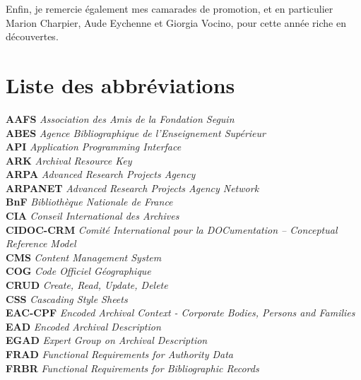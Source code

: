 \documentclass[a4paper,12pt,twoside]{book}
\begin{document}
 Enfin, je remercie également mes camarades de promotion, et en particulier Marion Charpier, Aude Eychenne et Giorgia Vocino, pour cette année riche en découvertes. 

	
	\printbibliography
	\chapter{Liste des abbréviations}
 \noindent
\textbf{AAFS}     \space\space\space\textit{Association des Amis de la Fondation Seguin}\\
\textbf{ABES}     \space\space\space\textit{Agence Bibliographique de l'Enseignement Supérieur}\\
\textbf{API}     \space\space\space\textit{Application Programming Interface}\\
\textbf{ARK}     \space\space\space\textit{Archival Resource Key}\\
\textbf{ARPA}     \space\space\space\textit{Advanced Research Projects Agency}\\
\textbf{ARPANET}     \space\space\space\textit{Advanced Research Projects Agency Network}\\
\textbf{BnF}     \space\space\space\textit{Bibliothèque Nationale de France}\\
\textbf{CIA}     \space\space\space\textit{Conseil International des Archives}\\
\textbf{CIDOC-CRM}     \space\space\space\textit{Comité International pour la DOCumentation – Conceptual Reference Model}\\
\textbf{CMS}     \space\space\space\textit{Content Management System}\\
\textbf{COG}     \space\space\space\textit{Code Officiel Géographique}\\
\textbf{CRUD}     \space\space\space\textit{Create, Read, Update, Delete}\\
\textbf{CSS}     \space\space\space\textit{Cascading Style Sheets}\\
\textbf{EAC-CPF}     \space\space\space\textit{Encoded Archival Context - Corporate Bodies, Persons and Families}\\
\textbf{EAD}     \space\space\space\textit{Encoded Archival Description}\\
\textbf{EGAD}     \space\space\space\textit{Expert Group on Archival Description}\\
\textbf{FRAD}     \space\space\space\textit{Functional Requirements for Authority Data}\\
\textbf{FRBR}     \space\space\space\textit{Functional Requirements for Bibliographic Records}\\
\end{document}
